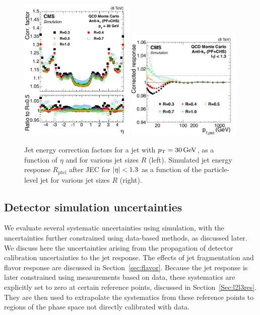\documentclass[11pt,twoside,a4paper,cmspaper,final,collab]{cms-tdr}
\begin{document}
\begin{figure}[htbp!]
\centering
\includegraphics*[width=0.49\textwidth]{Figure_011-a.pdf}
\includegraphics[width=0.49\textwidth]{Figure_011-b.pdf}
\caption{\label{fig:rcone}
Jet energy correction factors for a jet with $p_{\mathrm{T}}=30\,\text{Ge\hspace{-.08em}V}$, as a function of $\eta$ and for various jet sizes $R$ (left).
Simulated jet energy response $R_\mathrm{ptcl}$ after JEC for $\lvert \eta \rvert<1.3$ as a function of the particle-level jet \pt for various jet sizes $R$ (right).
}
\end{figure}

\subsection{Detector simulation uncertainties}

We evaluate several systematic uncertainties using simulation, with the uncertainties further constrained using data-based methods, as discussed later. We discuss here the uncertainties arising from the propagation of detector calibration uncertainties to the jet response. The effects of jet fragmentation and flavor response are discussed in Section~\ref{sec:flavor}.
Because the jet response is later constrained using measurements based on data, these systematics are explicitly set to zero at certain reference points, discussed in Section~\ref{Sec:l2l3res}. They are then used to extrapolate the systematics from these reference points to regions of the phase space not directly calibrated with data.
\end{document}
